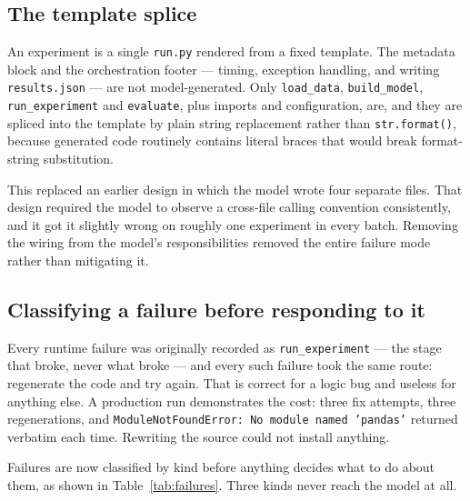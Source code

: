\subsection{The template splice}

An experiment is a single \texttt{run.py} rendered from a fixed template. The metadata block
and the orchestration footer --- timing, exception handling, and writing
\texttt{results.json} --- are not model-generated. Only \texttt{load\_data},
\texttt{build\_model}, \texttt{run\_experiment} and \texttt{evaluate}, plus imports and
configuration, are, and they are spliced into the template by plain string replacement rather
than \texttt{str.format()}, because generated code routinely contains literal braces that
would break format-string substitution.

This replaced an earlier design in which the model wrote four separate files. That design
required the model to observe a cross-file calling convention consistently, and it got it
slightly wrong on roughly one experiment in every batch. Removing the wiring from the model's
responsibilities removed the entire failure mode rather than mitigating it.

\subsection{Classifying a failure before responding to it}

Every runtime failure was originally recorded as \texttt{run\_experiment} --- the stage that
broke, never what broke --- and every such failure took the same route: regenerate the code and
try again. That is correct for a logic bug and useless for anything else. A production run
demonstrates the cost: three fix attempts, three regenerations, and
\texttt{ModuleNotFoundError: No module named 'pandas'} returned verbatim each time. Rewriting
the source could not install anything.

Failures are now classified by kind before anything decides what to do about them, as shown in
Table~\ref{tab:failures}. Three kinds never reach the model at all.

